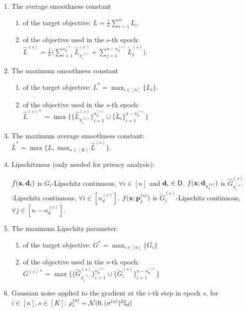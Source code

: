 \begin{enumerate}[itemsep=0mm]
    
    \item The average smoothness constant 
    \begin{enumerate}[itemsep=0mm]
        \item of the target objective: $L = \frac{1}{n}\sum_{i=1}^{n} L_i$.
        \item of the objective used in the $s$-th epoch: 
        $\widehat{L}^{(s)} = \frac{1}{n}\Big( \sum_{i=1}^{n_d^{(s)}}\widehat{L}_{\pi_i^{(s)}}^{(s)} + \sum_{j=1}^{n-n_d^{(s)}} \widetilde{L}_{j}^{(s)} \Big)$.
    \end{enumerate}

    \item The maximum smoothness constant
    \begin{enumerate}[itemsep=0mm]
        \item of the target objective: $L^* = \max_{i\in[n]}\{L_i\}$.
        \item of the objective used in the $s$-th epoch: $\widehat{L}^{(s)*} = \max\{
        \{\widehat{L}_{\pi_i^{(s)}}^{(s)}\}_{i=1}^{n_d^{(s)}} \cup
        \{\widetilde{L}_{i}\}_{i=1}^{n-n_d^{(s)}} \}$
    \end{enumerate}

    \item The maximum average smoothness constant: $\bar{L}^{*} = \max\{L, \max_{s\in [K]}\widehat{L}^{(s)}\}$.

    \item Lipschitzness (only needed for privacy analysis):
    \begin{assumption}
    \label{ass:appendix_refined_lipschitzness}
        $f({\mathbf{x}}, {\mathbf{d}}_i)$ is $G_i$-Lipschitz continuous, $\forall i\in [n]$ and ${\mathbf{d}}_i\in {\mathsf{D}}$. $f({\mathbf{x}}; {\mathbf{d}}_{\pi_i^{(s)}})$ is $\widehat{G}_{\pi_i^{(s)}}^{(s)}$-Lipschitz continuous, $\forall i\in [n_d^{(s)}]$. $f({\mathbf{x}}; {\mathbf{p}}_j^{(s)})$ is $\widetilde{G}_j^{(s)}$-Lipschitz continuous, $\forall j\in [n-n_d^{(s)}]$. 
    \end{assumption}


    \item The maximum Lipschitz parameter:
        \begin{enumerate}[itemsep=0mm]
            \item of the target objective: $G^{*} = \max_{i\in [n]}\{G_i\}$
            \item of the objective used in the $s$-th epoch: $G^{(s)*} = \max\{ \{ \widehat{G}_{\pi_i^{(s)}}^{(s)}\}_{i=1}^{n_d^{(s)}} \cup \{\widetilde{G}_{i}^{(s)}\}_{i=1}^{n-n_d^{(s)}} \}$
        \end{enumerate}

    \item Gaussian noise applied to the gradient at the $i$-th step in epoch $s$, for $i \in [n], s\in [K]$: $\rho_i^{(s)} \sim {\mathcal{N}}(0, (\sigma^{(s)})^2{\mathbb{I}}_d)$

\end{enumerate}

